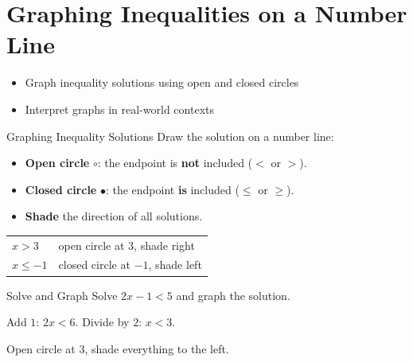 \section{Graphing Inequalities on a Number Line}

\begin{learningGoals}
\begin{itemize}
    \item Graph inequality solutions using open and closed circles
    \item Interpret graphs in real-world contexts
\end{itemize}
\end{learningGoals}

\begin{conceptBox}{Graphing Inequality Solutions}
Draw the solution on a number line:
\begin{itemize}[leftmargin=*]
    \item \textbf{Open circle} $\circ$: the endpoint is \textbf{not} included ($<$ or $>$).
    \item \textbf{Closed circle} $\bullet$: the endpoint \textbf{is} included ($\leq$ or $\geq$).
    \item \textbf{Shade} the direction of all solutions.
\end{itemize}
\begin{center}
\begin{tabular}{l l}
    $x > 3$ & open circle at $3$, shade right \\
    $x \leq -1$ & closed circle at $-1$, shade left \\
\end{tabular}
\end{center}
\end{conceptBox}

\begin{workedExample}{Solve and Graph}
Solve $2x - 1 < 5$ and graph the solution.

Add $1$: $2x < 6$. \quad Divide by $2$: $x < 3$.


Open circle at $3$, shade everything to the left.
\end{workedExample}



